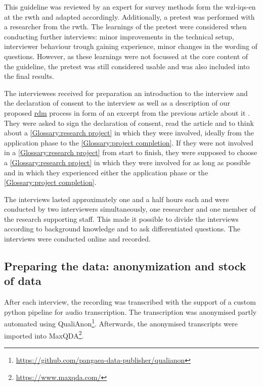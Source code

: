 \documentclass{bausteinefdm}
\begin{document}
This guideline was reviewed by an expert for survey methods form the \ac{wzl-iqs-en} at the \ac{rwth} and adapted accordingly.
Additionally, a pretest was performed with a researcher from the \ac{rwth}.
The learnings of the pretest were considered when conducting further interviews: minor improvements in the technical setup, interviewer behaviour trough gaining experience, minor changes in the wording of questions.
However, as these learnings were not focussed at the core content of the guideline, the pretest was still considered usable and was also included into the final results.


The interviewees received for preparation an introduction to the interview and the declaration of consent to the interview as well as a description of our proposed \hyperref[Glossary:research data management level]{\ac{rdm}} process in form of an excerpt from the previous article about it \cite{Hamann.2024b}. They were asked to sign the declaration of consent, read the article and to think about a \ref{Glossary:research project} in which they were involved, ideally from the application phase to the \ref{Glossary:project completion}. If they were not involved in a \ref{Glossary:research project} from start to finish, they were supposed to choose a \ref{Glossary:research project} in which they were involved for as long as possible and in which they experienced either the application phase or the \ref{Glossary:project completion}.

The interviews lasted approximately one and a half hours each and were conducted by two interviewers simultaneously, one researcher and one member of the research supporting staff. This made it possible to divide the interviews according to background knowledge and to ask differentiated questions. The interviews were conducted online and recorded.

\subsection{Preparing the data: anonymization and stock of data}
\label{AnonymisierungDatenbestand}


After each interview, the recording was transcribed with the support of a custom python pipeline for audio transcription.
The transcription was anonymised partly automated using QualiAnon\footnote{\url{https://github.com/pangaea-data-publisher/qualianon}}. \cite{Mozygemba.2023}
Afterwards, the anonymised transcripts were imported into MaxQDA\footnote{\url{https://www.maxqda.com/}}.
\end{document}
